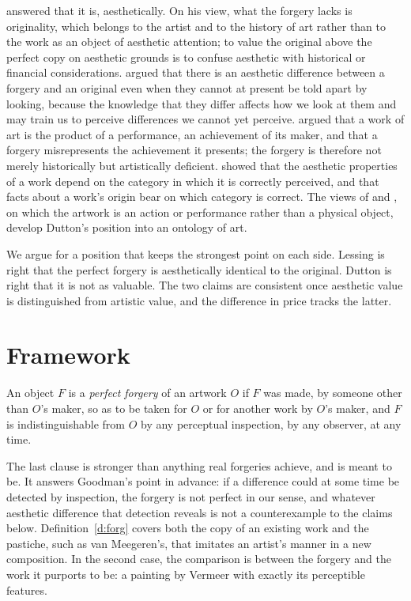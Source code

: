 \documentclass{situationist-preprint}
\begin{document}
\citet{Lessing1965} answered that it is, aesthetically. On his view, what the forgery lacks is originality, which belongs to the artist and to the history of art rather than to the work as an object of aesthetic attention; to value the original above the perfect copy on aesthetic grounds is to confuse aesthetic with historical or financial considerations. \citet{Goodman1968} argued that there is an aesthetic difference between a forgery and an original even when they cannot at present be told apart by looking, because the knowledge that they differ affects how we look at them and may train us to perceive differences we cannot yet perceive. \citet{Dutton1979} argued that a work of art is the product of a performance, an achievement of its maker, and that a forgery misrepresents the achievement it presents; the forgery is therefore not merely historically but artistically deficient. \citet{Walton1970} showed that the aesthetic properties of a work depend on the category in which it is correctly perceived, and that facts about a work's origin bear on which category is correct. The views of \citet{Currie1989} and \citet{DDavies2004}, on which the artwork is an action or performance rather than a physical object, develop Dutton's position into an ontology of art.

We argue for a position that keeps the strongest point on each side. Lessing is right that the perfect forgery is aesthetically identical to the original. Dutton is right that it is not as valuable. The two claims are consistent once aesthetic value is distinguished from artistic value, and the difference in price tracks the latter.

\section{Framework}

\begin{definition}\label{d:forg}
An object $F$ is a \emph{perfect forgery} of an artwork $O$ if $F$ was made, by someone other than $O$'s maker, so as to be taken for $O$ or for another work by $O$'s maker, and $F$ is indistinguishable from $O$ by any perceptual inspection, by any observer, at any time.
\end{definition}

The last clause is stronger than anything real forgeries achieve, and is meant to be. It answers Goodman's point in advance: if a difference could at some time be detected by inspection, the forgery is not perfect in our sense, and whatever aesthetic difference that detection reveals is not a counterexample to the claims below. Definition~\ref{d:forg} covers both the copy of an existing work and the pastiche, such as van Meegeren's, that imitates an artist's manner in a new composition. In the second case, the comparison is between the forgery and the work it purports to be: a painting by Vermeer with exactly its perceptible features.
\end{document}
